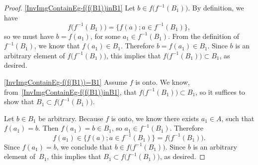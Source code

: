 \documentclass[../MATH-2000-Notes.tex]{subfiles}
\begin{document}
\begin{proof}
    \ref{InvImgContainEg-f(f(B1))inB1} Let $b \in f \bigl( f^{-1}(B_1) \bigr)$. By definition, we have
    $$ f \bigl( f^{-1}(B_1) \bigr) = \{ f(a); a \in f^{-1}(B_1) \} ,$$
    so we must have $b =  f(a_1)$, for some $a_1 \in f^{-1}(B_1)$. From the definition of $f^{-1}(B_1)$, we know that $f(a_1) \in B_1$. Therefore $b = f(a_1) \in B_1$. Since $b$ is an arbitrary element of $f \bigl( f^{-1}(B_1) \bigr)$, this implies that $f \bigl( f^{-1}(B_1) \bigr) \subset B_1$, as desired.

    \smallskip
    \ref{InvImgContainEg-f(f(B1))=B1} Assume $f$ is onto. We know, from~\ref{InvImgContainEg-f(f(B1))inB1}, that $f \bigl( f^{-1}(B_1) \bigr) \subset B_1$, so it suffices to show that $B_1 \subset f \bigl( f^{-1}(B_1) \bigr)$.

    Let $b \in B_1$ be arbitrary. Because $f$ is onto, we know there exists $a_1 \in A$, such that $f(a_1) = b$. Then $f(a_1) = b \in B_1$, so $a_1 \in  f^{-1}(B_1)$. Therefore
    $$ f(a_1) \in \{ f(a); a \in f^{-1}(B_1) \} = f \bigl( f^{-1}(B_1) \bigr) .$$
    Since $f(a_1) = b$, we conclude that $b \in f \bigl( f^{-1}(B_1) \bigr)$.
    Since $b$ is an arbitrary element of~$B_1$, this implies that $B_1 \subset f \bigl( f^{-1}(B_1) \bigr)$, as desired.
\end{proof}
\end{document}
